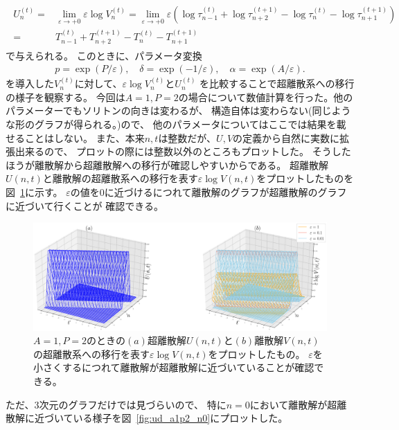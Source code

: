 \documentclass{jsarticle}
\begin{document}
\begin{enumerate}
\begin{align}
\begin{split}
U_{n}^{(t)}=&\lim_{\varepsilon\to+0}\varepsilon\log V_{n}^{(t)}
=\lim_{\varepsilon\to+0}\varepsilon\left(\log\tau_{n-1}^{(t)}+\log\tau_{n+2}^{(t+1)}-\log\tau_{n}^{(t)}-\log\tau_{n+1}^{(t+1)}\right)\\
=&T_{n-1}^{(t)}+T_{n+2}^{(t+1)}-T_{n}^{(t)}-T_{n+1}^{(t+1)}
\end{split}
\end{align}
で与えられる。
このときに、パラメータ変換
\begin{align}
p=\exp\left(P/\varepsilon\right),\quad
\delta=\exp\left(-1/\varepsilon\right),\quad
\alpha=\exp\left(A/\varepsilon\right).
\end{align}
を導入した$V_{n}^{(t)}$に対して、$\varepsilon\log V_{n}^{(t)}$と$U_{n}^{(t)}$
を比較することで超離散系への移行の様子を観察する。
今回は$A=1,P=2$の場合について数値計算を行った。他のパラメーターでもソリトンの向きは変わるが、
構造自体は変わらない(同じような形のグラフが得られる。)ので、
他のパラメータについてはここでは結果を載せることはしない。
また、本来$n,t$は整数だが、$U,V$の定義から自然に実数に拡張出来るので、
プロットの際には整数以外のところもプロットした。
そうしたほうが離散解から超離散解への移行が確認しやすいからである。
超離散解$U(n,t)$と離散解の超離散系への移行を表す$\varepsilon\log V(n,t)$をプロットしたものを図~\ref{fig:ud_a1p2}に示す。
$\varepsilon$の値を$0$に近づけるにつれて離散解のグラフが超離散解のグラフに近づいて行くことが
確認できる。

\begin{figure}[H]
\begin{center}
\includegraphics[width=16cm]{lv_a1p3.eps}
\caption{$A=1,P=2$のときの$(a)$超離散解$U(n,t)$と$(b)$離散解$V(n,t)$の超離散系への移行を表す$\varepsilon\log V(n,t)$をプロットしたもの。
$\varepsilon$を小さくするにつれて離散解が超離散解に近づいていることが確認できる。}
\label{fig:ud_a1p2}
\end{center}
\end{figure}

ただ、3次元のグラフだけでは見づらいので、
特に$n=0$において離散解が超離散解に近づいている様子を図~\ref{fig:ud_a1p2_n0}にプロットした。


\end{enumerate}
\end{document}
